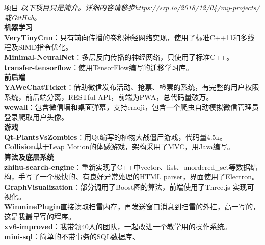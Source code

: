 \documentclass{resume}
\begin{document}
\begin{rSection}{项目}
\textit{以下项目只是简介。详细内容请移步\underline{\url{https://szp.io/2018/12/04/my-projects/}}或GitHub。}\\
\hspace*{-0.2in}\textbf{机器学习}\\
\textbf{VeryTinyCnn}：只有前向传播的卷积神经网络实现，使用了标准C++11和多线程及SIMD指令优化。\\
\textbf{Minimal-NeuralNet}：多层反向传播的神经网络，只使用了标准C++。\\
\textbf{transfer-tensorflow}：使用TensorFlow编写的迁移学习库。\\
\hspace*{-0.2in}\textbf{前后端}\\
\textbf{YAWeChatTicket}：借助微信发布活动、抢票、检票的系统，有完整的用户权限系统，前后端分离，RESTful API，前端为PWA，总代码量破万。\\
\textbf{wewall}：包含微信墙和桌面弹幕，支持emoji，包含一个爬虫自动模拟微信管理员登录爬取用户头像。\\
\hspace*{-0.2in}\textbf{游戏}\\
\textbf{Qt-PlantsVsZombies}：用Qt编写的植物大战僵尸游戏，代码量4.5k。\\
\textbf{Collision}基于Leap Motion的体感游戏，架构采用了MVC，用Java编写。\\
\hspace*{-0.2in}\textbf{算法及底层系统}\\
\textbf{zhihu-search-engine}：重新实现了C++中vector、list、unordered\_set等数据结构，手写了一个极快的、有良好异常处理的HTML parser，界面使用了Electron。\\
\textbf{GraphVisualization}：部分调用了Boost图的算法，前端使用了Three.js 实现可视化。\\
\textbf{WinminePlugin}直接读取扫雷内存，再发送窗口消息到扫雷的外挂，高一写的，这是我最早写的程序。\\
\textbf{xv6-improved}：我带领40人的团队，一起改进一个教学用的操作系统。\\
\textbf{mini-sql}：简单的不带事务的SQL数据库、
\end{rSection}
\end{document}
